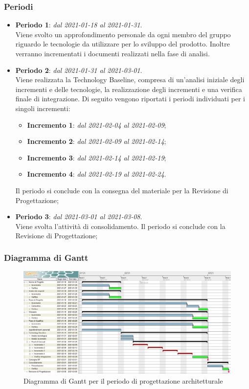 \subsubsection{Periodi}

\begin{itemize}
\item \textbf{Periodo 1}: \textit{dal 2021-01-18 al 2021-01-31}. \\
Viene svolto un approfondimento personale da ogni membro del gruppo riguardo le tecnologie da utilizzare per lo sviluppo del prodotto. Inoltre verranno incrementati i documenti realizzati nella fase di analisi.
\item \textbf{Periodo 2}: \textit{dal 2021-01-31 al 2021-03-01}. \\
Viene realizzata la Technology Baseline, compresa di un'analisi iniziale degli incrementi e delle tecnologie, la realizzazione degli incrementi e una verifica finale di integrazione. Di seguito vengono riportati i periodi individuati per i singoli incrementi:
\begin{itemize}
\item \textbf{Incremento 1}: \textit{dal 2021-02-04 al 2021-02-09};
\item \textbf{Incremento 2}: \textit{dal 2021-02-09 al 2021-02-14};
\item \textbf{Incremento 3}: \textit{dal 2021-02-14 al 2021-02-19};
\item \textbf{Incremento 4}: \textit{dal 2021-02-19 al 2021-02-24}.
\end{itemize}
Il periodo si conclude con la consegna del materiale per la Revisione di Progettazione;
\item \textbf{Periodo 3}: \textit{dal 2021-03-01 al 2021-03-08}. \\
Viene svolta l'attività di consolidamento. Il periodo si conclude con la Revisione di Progettazione;
\end{itemize}


\subsubsection{Diagramma di Gantt}

\begin{figure}[H]
\centering

\centerline{\includegraphics[scale=0.5]{res/Pianificazione/Gantt/progettazione}}
\caption{Diagramma di Gantt per il periodo di progettazione architetturale}
\end{figure}

